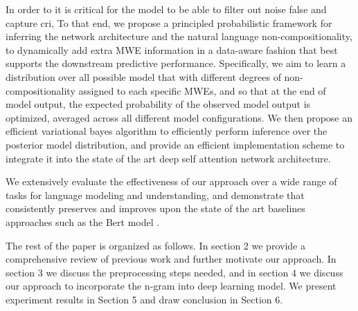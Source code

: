 In order to 
it is critical for the model to be able to filter out noise false and capture cri, 
To that end, we propose a principled probabilistic framework for inferring the network architecture and the natural language non-compositionality, 
to dynamically add extra MWE information in a data-aware fashion
that best supports the downstream predictive performance. 
Specifically, we aim to learn a distribution over all possible model that with different degrees of non-compositionality assigned to each specific MWEs, and so that at the end of model output, the expected probability of the observed model output is optimized, averaged across all different model configurations.
We then propose an efficient variational bayes algorithm to efficiently perform inference over the posterior model distribution, and provide an efficient implementation scheme to integrate it into the state of the art deep self attention network architecture. 

We extensively evaluate the effectiveness of our approach over a wide range of tasks for language modeling and understanding, and demonstrate that \BertMWE consistently preserves and improves upon the state of the art baselines approaches such as the Bert model \cite{devlin2018bert}.



The rest of the paper is organized as follows. In section 2 we provide a comprehensive review of previous work and further motivate our approach. In section 3 we discuss the preprocessing steps needed, and in section 4 we discuss our approach to incorporate the n-gram into deep learning model. We present experiment results in Section 5 and draw conclusion in Section 6.
